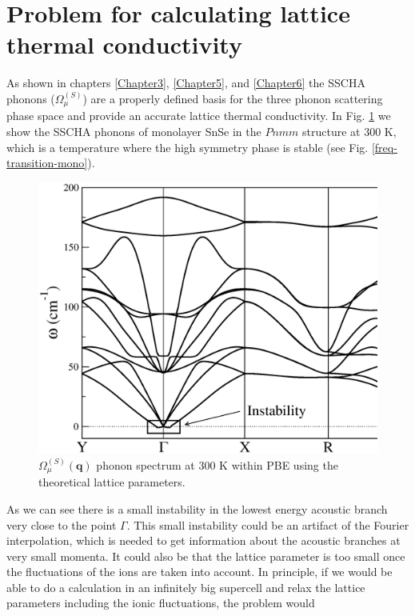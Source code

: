 \section{Problem for calculating lattice thermal conductivity}

As shown in chapters \ref{Chapter3}, \ref{Chapter5}, and \ref{Chapter6} the SSCHA phonons ($\Omega^{(S)}_{\mu}$) are 
a properly defined basis for the three phonon scattering phase space and provide an accurate lattice thermal 
conductivity. In Fig. \ref{sscha-freq-mono} we show the SSCHA phonons of monolayer SnSe in the $Pnmm$ structure at 
$300$ K, which is a temperature where the high symmetry phase is stable (see Fig. \ref{freq-transition-mono}).
\begin{figure}[h]
\includegraphics[width=\linewidth]{Figures/sscha-mono.eps}
\caption[Anharmonic phonons in monolayer SnSe.]{$\Omega^{(S)}_{\mu}(\boldsymbol{q})$ phonon spectrum at $300$ K 
within PBE using the theoretical lattice parameters.}
\label{sscha-freq-mono}
\end{figure}
As we can see there is a small instability in the lowest energy acoustic branch very close to the point $\Gamma$. 
This small instability could be an artifact of the Fourier interpolation, which is needed to get information about 
the acoustic branches at very small momenta. It could also be that the lattice parameter is too small once the 
fluctuations of the ions are taken into account. In principle, if we would be able to do a calculation in an 
infinitely big supercell and relax the lattice parameters including the ionic fluctuations, the problem would 
